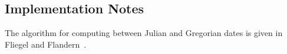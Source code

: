 
\subsection{Implementation Notes}

The algorithm for computing between Julian and Gregorian dates is given 
in Fliegel and Flandern~\cite{fliegel}.